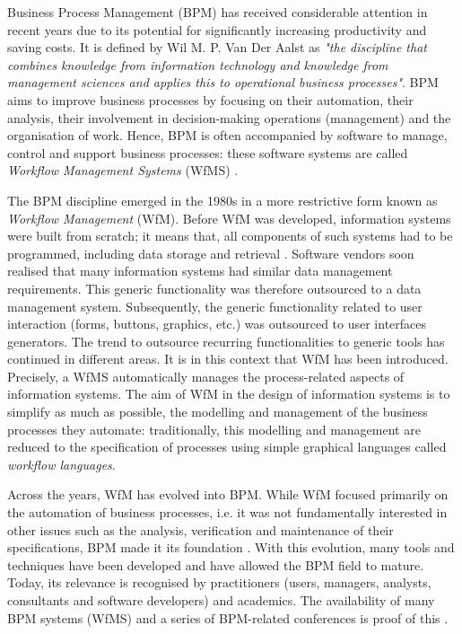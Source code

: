 \label{chap0:introduction}

\label{chap0:sec:bpm-emergence}
Business Process Management (BPM) has received considerable attention in recent years due to its potential for significantly increasing productivity and saving costs. It is defined by Wil M. P. Van Der Aalst \citeyearpar{van2013business} as \textit{"the discipline that combines knowledge from information technology and knowledge from management sciences and applies this to operational business processes"}. BPM aims to improve business processes by focusing on their automation, their analysis, their involvement in decision-making operations (management) and the organisation of work. Hence, BPM is often accompanied by software to manage, control and support business processes: these software systems are called \textit{Workflow Management Systems} (WfMS) \cite{workflow95, ima}.

The BPM discipline emerged in the 1980s in a more restrictive form known as \textit{Workflow Management} (WfM). Before WfM was developed, information systems were built from scratch; it means that, all components of such systems had to be programmed, including data storage and retrieval \cite{van1998application}. Software vendors soon realised that many information systems had similar data management requirements. This generic functionality was therefore outsourced to a data management system. Subsequently, the generic functionality related to user interaction (forms, buttons, graphics, etc.) was outsourced to user interfaces generators. The trend to outsource recurring functionalities to generic tools has continued in different areas. It is in this context that WfM has been introduced. Precisely, a WfMS automatically manages the process-related aspects \cite{workflow95, van2013business} of information systems. The aim of WfM in the design of information systems is to simplify as much as possible, the modelling and management of the business processes they automate: traditionally, this modelling and management are reduced to the specification of processes using simple graphical languages called \textit{workflow languages}.

Across the years, WfM has evolved into BPM. While WfM focused primarily on the automation of business processes, i.e. it was not fundamentally interested in other issues such as the analysis, verification and maintenance of their specifications, BPM made it its foundation \cite{van2016don}. With this evolution, many tools and techniques have been developed and have allowed the BPM field to mature. Today, its relevance is recognised by practitioners (users, managers, analysts, consultants and software developers) and academics. The availability of many BPM systems (WfMS) and a series of BPM-related conferences is proof of this \cite{van2013business}.

